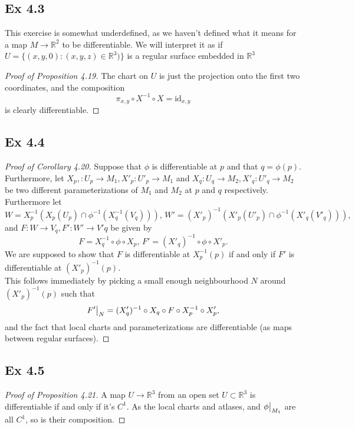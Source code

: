 \documentclass{article}
\newcommand\restr[2]{{%
  \left.\kern-\nulldelimiterspace %
  #1 %
  \vphantom{\big|} %
  \right|_{#2} %
  }}
\theoremstyle{definition}
\newcommand{\R}{\mathbb{R}}
\newcommand{\id}{\text{id}}
\begin{document}
\subsection*{Ex 4.3}

This exercise is somewhat underdefined, as we haven't defined what it means for
a map $M \to \R^2$ to be differentiable. We will interpret it as if $U = \{(x,
y, 0) : (x,y,z) \in \R^3)\}$ is a regular surface embedded in $\R^3$

\begin{proof}[Proof of Proposition 4.19]
	The chart on $U$ is just the projection onto the first two coordinates,
	and the composition
	\[
		\pi_{x, y} \circ X^{-1} \circ X
		=
		\id_{x, y}
	\] 
	is clearly differentiable.
\end{proof}

\subsection*{Ex 4.4}

\begin{proof}[Proof of Corollary 4.20]

	Suppose that $\phi$ is differentiable at $p$ and that $q = \phi(p)$.
	Furthermore, let $X_p, : U_p \to M_1, X'_p : U'_p \to M_1$ and $X_q : U_q
	\to M_2, X'_{q} : U'_q \to M_2$ be two different parameterizations of $M_1$
	and $M_2$ at $p$ and $q$ respectively. Furthermore let
	\[
		W = X_p^{-1}(X_p(U_p) \cap \phi^{-1}(X_{q}^{-1}(V_q))),\, 
		W' = (X'_p)^{-1}(X'_p(U'_p) \cap \phi^{-1}(X'_{q}(V'_q))),\, 
	\] 
	and $F : W \to V_q, F': W' \to V'q$ be given by 
	\[
		F = X_q^{-1} \circ \phi \circ X_p, \,
		F' = (X'_q)^{-1} \circ \phi \circ X'_p.
	\] 
	We are supposed to show that $F$ is differentiable at $X_p^{-1}(p)$ if and
	only if $F'$ is differentiable at $(X'_p)^{-1}(p)$.  \\

	This follows immediately by picking a small enough neighbourhood $N$ around
	$(X'_p)^{-1}(p)$ such that
	\[
		\restr{F'}{N} = (X'_{q})^{-1} \circ X_q \circ F \circ X_p^{-1} \circ X'_p,
	\] 
	and the fact that local charts and parameterizations are differentiable (as maps 
	between regular surfaces).
\end{proof}

\subsection*{Ex 4.5}

\begin{proof}[Proof of Proposition 4.21]
	A map $U \to \R^3$ from an open set $U \subset \R^{3}$ is differentiable if
	and only if it's $C^{1}$. As the local charts and atlases, and
	$\restr{\phi}{M_1}$ are all $C^1$, so is their composition.
\end{proof}
\end{document}
